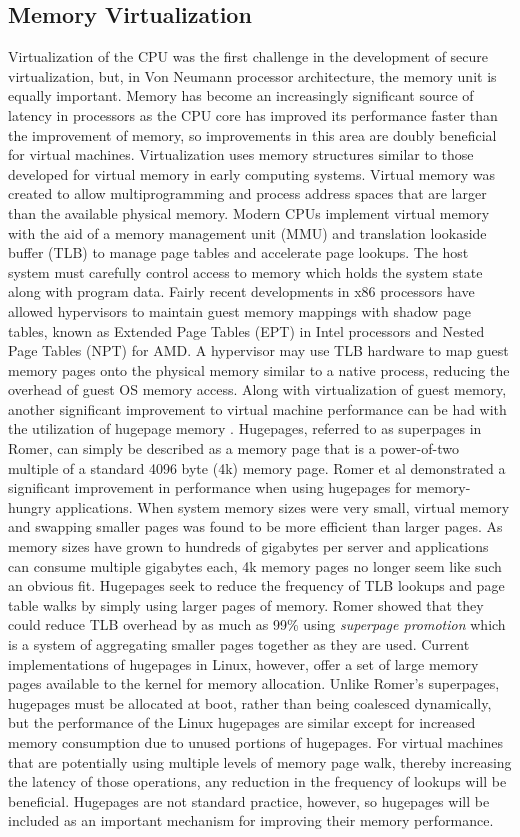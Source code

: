 \subsection{Memory Virtualization}
\label{sec:vt_memory}
Virtualization of the CPU was the first challenge in the development of secure virtualization, but, in Von Neumann processor architecture, the memory unit is equally important.
Memory has become an increasingly significant source of latency in processors as the CPU core has improved its performance faster than the improvement of memory, so improvements in this area are doubly beneficial for virtual machines.
Virtualization uses memory structures similar to those developed for virtual memory in early computing systems.
Virtual memory was created to allow multiprogramming and process address spaces that are larger than the available physical memory.
Modern CPUs implement virtual memory with the aid of a memory management unit (MMU) and translation lookaside buffer (TLB) to manage page tables and accelerate page lookups.
The host system must carefully control access to memory which holds the system state along with program data.
Fairly recent developments in x86 processors have allowed hypervisors to maintain guest memory mappings with shadow page tables, known as Extended Page Tables (EPT) in Intel processors and Nested Page Tables (NPT) for AMD.
A hypervisor may use TLB hardware to map guest memory pages onto the physical memory similar to a native process, reducing the overhead of guest OS memory access.
Along with virtualization of guest memory, another significant improvement to virtual machine performance can be had with the utilization of hugepage memory \autocite{_romer_1}.
Hugepages, referred to as superpages in Romer, can simply be described as a memory page that is a power-of-two multiple of a standard 4096 byte (4k) memory page.
Romer et al demonstrated a significant improvement in performance when using hugepages for memory-hungry applications.
When system memory sizes were very small, virtual memory and swapping smaller pages was found to be more efficient than larger pages.
As memory sizes have grown to hundreds of gigabytes per server and applications can consume multiple gigabytes each, 4k memory pages no longer seem like such an obvious fit.
Hugepages seek to reduce the frequency of TLB lookups and page table walks by simply using larger pages of memory.
Romer showed that they could reduce TLB overhead by as much as 99\% using \emph{superpage promotion} which is a system of aggregating smaller pages together as they are used.
Current implementations of hugepages in Linux, however, offer a set of large memory pages available to the kernel for memory allocation.
Unlike Romer's superpages, hugepages must be allocated at boot, rather than being coalesced dynamically, but the performance of the Linux hugepages are similar except for increased memory consumption due to unused portions of hugepages.
For virtual machines that are potentially using multiple levels of memory page walk, thereby increasing the latency of those operations, any reduction in the frequency of lookups will be beneficial.
Hugepages are not standard practice, however, so hugepages will be included as an important mechanism for improving their memory performance.

